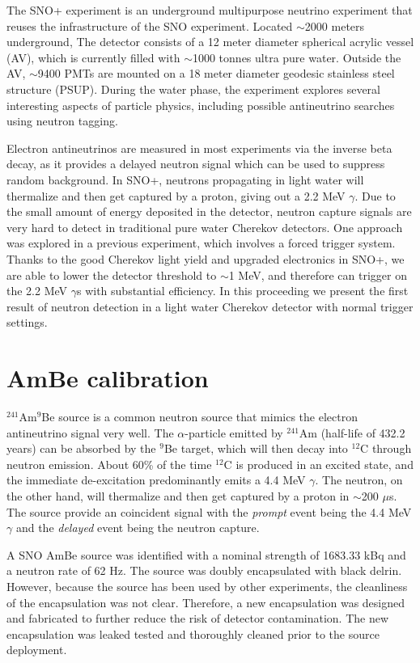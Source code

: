 \documentclass[a4paper]{jpconf}
\begin{document}
The SNO+ experiment\cite{Andringa:2015tza} is an underground multipurpose neutrino experiment that reuses the infrastructure of the SNO experiment. Located $\sim$2000 meters underground, The detector consists of a 12 meter diameter spherical acrylic vessel (AV), which is currently filled with $\sim$1000 tonnes ultra pure water. Outside the AV, $\sim$9400 PMTs are mounted on a 18 meter diameter geodesic stainless steel structure (PSUP). During the water phase, the experiment explores several interesting aspects of particle physics, including possible antineutrino searches using neutron tagging.

Electron antineutrinos are measured in most experiments via the inverse beta decay, as it provides a delayed neutron signal which can be used to suppress random background. In SNO+, neutrons propagating in light water will thermalize and then get captured by a proton, giving out a 2.2 MeV $\gamma$. Due to the small amount of energy deposited in the detector, neutron capture signals are very hard to detect in traditional pure water Cherekov detectors. One approach\cite{Watanabe:2008ru} was explored in a previous experiment, which involves a forced trigger system. Thanks to the good Cherekov light yield and upgraded electronics in SNO+, we are able to lower the detector threshold to $\sim$1 MeV, and therefore can trigger on the 2.2 MeV $\gamma$s with substantial efficiency. In this proceeding we present the first result of neutron detection in a light water Cherekov detector with normal trigger settings. 


\section{AmBe calibration}


$^{241}$Am$^{9}$Be source is a common neutron source that mimics the electron antineutrino signal very well. The $\alpha$-particle emitted by $^{241}$Am (half-life of 432.2 years) can be absorbed by the $^{9}$Be target, which will then decay into $^{12}$C through neutron emission. About 60\% of the time $^{12}$C is produced in an excited state, and the immediate de-excitation predominantly emits a 4.4 MeV $\gamma$. The neutron, on the other hand, will thermalize and then get captured by a proton in $\sim$200 $\mu$s. The source provide an coincident signal with the \textit{prompt} event being the 4.4 MeV $\gamma$ and the \textit{delayed} event being the neutron capture.

A SNO AmBe source was identified with a nominal strength of 1683.33 kBq and a neutron rate of 62 Hz\cite{jloach2009:diss}. The source was doubly encapsulated with black delrin. However, because the source has been used by other experiments, the cleanliness of the encapsulation was not clear. Therefore, a new encapsulation was designed and fabricated to further reduce the risk of detector contamination. The new encapsulation was leaked tested and thoroughly cleaned prior to the source deployment.
\end{document}

